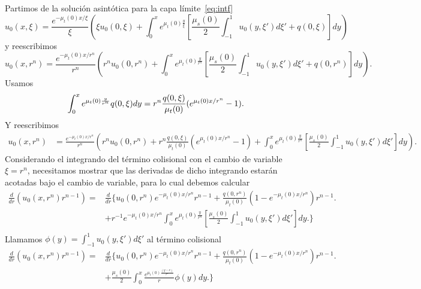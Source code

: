 Partimos de la solución asintótica para la capa límite~\eqref{eq:intf}
\begin{equation}
u_0(x,\xi) = \frac{e^{-\mu_t(0)x/\xi}}{\xi} \left(\xi u_0(0,\xi) + \int_0^{x} e^{\mu_t(0)\frac{y}{\xi}} \left[ \frac{\mu_s(0)}{2} \int_{-1}^1 u_0(y,\xi')d\xi' +q(0,\xi) \right] dy\right)
\label{eq:ecss}
\end{equation}
y reescribimos
\begin{equation}
u_0(x,r^n) = \frac{e^{-\mu_t(0)x/r^n}}{r^n} \left(r^n u_0(0,r^n) + \int_0^{x} e^{\mu_t(0)\frac{y}{r^n}} \left[ \frac{\mu_s(0)}{2} \int_{-1}^1 u_0(y,\xi')d\xi' +q(0,r^n) \right] dy\right).
\label{eq:ecsscv}
\end{equation}
Usamos
\begin{equation*}
\begin{split}
\int_0^{x} e^{\mu_t(0)\frac{y}{r^n}}q(0,\xi)dy=r^n\frac{q(0,\xi)}{\mu_t(0)}(e^{\mu_t(0)x/r^n}-1).
\end{split}
\raisetag{50pt}
\label{eq:boundedder2}
\end{equation*}
Y reescribimos
\begin{equation}
\begin{split}
u_0(x,r^n)& =\frac{e^{-\mu_t(0)x/r^n}}{r^n} \left(r^n u_0(0,r^n) +  r^n\frac{q(0,\xi)}{\mu_t(0)}(e^{\mu_t(0)x/r^n}-1) + \int_0^{x} e^{\mu_t(0)\frac{y}{r^n}} \left[ \frac{\mu_s(0)}{2} \int_{-1}^1 u_0(y,\xi')d\xi' \right] dy\right).
\end{split}
\label{eq:ecss2}
\end{equation}
Considerando el integrando del término colisional con el cambio de variable $\xi=r^n$, necesitamos mostrar que las derivadas de dicho integrando 
estarán acotadas bajo el cambio de variable, para lo cual debemos calcular
\begin{equation}
\begin{split}
\frac{d }{dr} \left( u_0(x,r^n) r^{n-1} \right)=&\frac{d }{dr} \Bigg\{ 
u_0(0,r^n) e^{-\mu_t(0)x/r^n}r^{n-1} + \frac{q(0,r^n)}{\mu_t(0)}\left(1-e^{-\mu_t(0)x/r^n}\right)r^{n-1}  \Bigg.\\
&+r^{-1}e^{-\mu_t(0)x/r^n}  \int_0^{x} e^{\mu_t(0)\frac{y}{r^n}} \left[ \frac{\mu_s(0)}{2} \int_{-1}^1 u_0(y,\xi')d\xi' \right] dy \Bigg. \Bigg\}\\
\end{split}
\label{eq:boundedder}
\end{equation}
Llamamos $\phi(y)=\int_{-1}^1 u_0(y,\xi')d\xi'$ al término colisional
\begin{equation}
\begin{split}
\frac{d }{dr} \left( u_0(x,r^n) r^{n-1} \right)=&\frac{d }{dr} \Bigg\{ 
u_0(0,r^n) e^{-\mu_t(0)x/r^n}r^{n-1} + \frac{q(0,r^n)}{\mu_t(0)}\left(1-e^{-\mu_t(0)x/r^n}\right)r^{n-1}  \Bigg.\\
&+ \frac{\mu_s(0)}{2} \int_0^{x} \frac{e^{\mu_t(0)\frac{(y-x)}{r^n}}}{r} \phi(y) dy \Bigg. \Bigg\}
\end{split}
\label{eq:boundedder2}
\end{equation}
